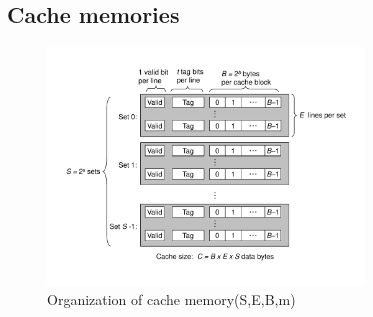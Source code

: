 \subsection{Cache memories}
\begin{figure}[ht]
\centering
\includegraphics[trim=30 50 30 50, clip, width=0.75\textwidth]{cacheorg.pdf}
\caption{Organization of cache memory(S,E,B,m)}
\end{figure}
